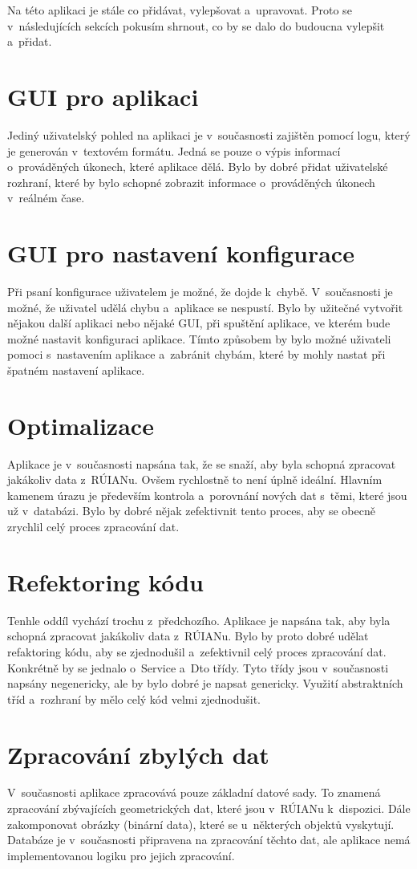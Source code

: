 \label{cha:NavrhDoBudoucna}
Na této aplikaci je stále co přidávat, vylepšovat a~upravovat.
Proto se v~následujících sekcích pokusím shrnout, co by se 
dalo do budoucna vylepšit a~přidat.

\section*{GUI pro aplikaci}
Jediný uživatelský pohled na aplikaci je v~současnosti zajištěn pomocí 
logu, který je generován v~textovém formátu. Jedná se pouze o výpis
informací o~prováděných úkonech, které aplikace dělá.
Bylo by dobré přidat uživatelské rozhraní, které by bylo schopné
zobrazit informace o~prováděných úkonech v~reálném čase.

\section*{GUI pro nastavení konfigurace}
Při psaní konfigurace uživatelem je možné, že dojde k~chybě.
V~současnosti je možné, že uživatel udělá chybu a~aplikace se
nespustí. Bylo by užitečné vytvořit nějakou další aplikaci nebo nějaké GUI,
při spuštění aplikace, ve kterém bude možné nastavit konfiguraci aplikace.
Tímto způsobem by bylo možné uživateli pomoci s~nastavením aplikace
a~zabránit chybám, které by mohly nastat při špatném nastavení aplikace.

\section*{Optimalizace}
Aplikace je v~současnosti napsána tak, že se snaží, aby byla schopná
zpracovat jakákoliv data z~RÚIANu. Ovšem rychlostně to není
úplně ideální. Hlavním kamenem úrazu je především kontrola
a~porovnání nových dat s~těmi, které jsou už v~databázi.
Bylo by dobré nějak zefektivnit tento proces, aby se obecně zrychlil
celý proces zpracování dat.

\section*{Refektoring kódu}
Tenhle oddíl vychází trochu z~předchozího. Aplikace je napsána
tak, aby byla schopná zpracovat jakákoliv data z~RÚIANu.
Bylo by proto dobré udělat refaktoring kódu, aby se zjednodušil
a~zefektivnil celý proces zpracování dat. Konkrétně by se jednalo
o~Service a~Dto třídy. Tyto třídy jsou v~současnosti napsány
negenericky, ale by bylo dobré je napsat genericky.
Využití abstraktních tříd a~rozhraní by mělo celý kód velmi
zjednodušit.

\section*{Zpracování zbylých dat}
V~současnosti aplikace zpracovává pouze základní datové sady.
To znamená zpracování zbývajících geometrických dat, které jsou
v~RÚIANu k~dispozici. Dále zakomponovat obrázky (binární data),
které se u~některých objektů vyskytují.
Databáze je v~současnosti připravena na zpracování těchto dat,
ale aplikace nemá implementovanou logiku pro jejich zpracování.